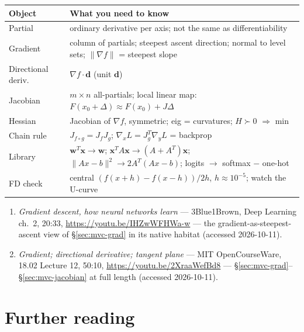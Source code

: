 \begin{center}
\begin{tabularx}{\textwidth}{l>{\raggedright\arraybackslash}X}
\toprule
\textbf{Object} & \textbf{What you need to know}\\
\midrule
Partial & ordinary derivative per axis; not the same as differentiability
\\
Gradient & column of partials; steepest ascent direction; normal to level
sets; $\lVert\nabla f\rVert$ = steepest slope \\
Directional deriv.\ & $\nabla f\cdot\mathbf d$ (unit $\mathbf d$) \\
Jacobian & $m\times n$ all-partials; local linear map: $F(x_0+\Delta)
\approx F(x_0)+J\Delta$ \\
Hessian & Jacobian of $\nabla f$, symmetric; eig = curvatures; $H\succ0$
$\Rightarrow$ min \\
Chain rule & $J_{f\circ g}=J_fJ_g$; $\nabla_x L=J_g^{T}\nabla_y L$ =
backprop \\
Library & $\mathbf w^{T}\mathbf x\to\mathbf w$; $\mathbf x^{T}A\mathbf
x\to(A+A^{T})\mathbf x$; $\|Ax-b\|^2\to2A^{T}(Ax-b)$; logits $\to$
softmax $-$ one-hot \\
FD check & central $(f(x{+}h){-}f(x{-}h))/2h$, $h{\approx}10^{-5}$; watch
the U-curve \\
\bottomrule
\end{tabularx}
\end{center}
\begin{rulebox}
\begin{enumerate}
\item \emph{Gradient descent, how neural networks learn} ---
3Blue1Brown, Deep Learning ch.~2, 20:33,
\url{https://youtu.be/IHZwWFHWa-w} --- the gradient-as-steepest-ascent
view of \S\ref{sec:mvc-grad} in its native habitat
(accessed 2026-10-11).
\item \emph{Gradient; directional derivative; tangent plane} --- MIT
OpenCourseWare, 18.02 Lecture 12, 50:10,
\url{https://youtu.be/2XraaWefBd8} ---
\S\ref{sec:mvc-grad}--\S\ref{sec:mvc-jacobian} at full length
(accessed 2026-10-11).
\end{enumerate}
\end{rulebox}

\section*{Further reading}

